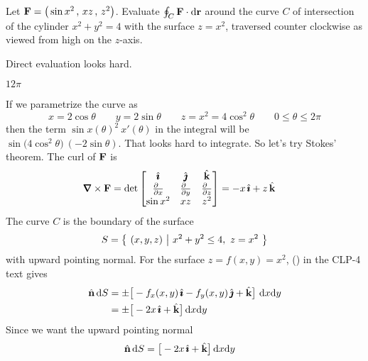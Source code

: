 \begin{question}[M317 2005A] %
Let $\mathbf{F} = \big(\sin x^2\,,\,xz\,,\,z^2\big)$.
Evaluate $\oint_C\mathbf{F}\cdot\mathrm{d}\mathbf{r}$ around the curve $C$ of
intersection of the cylinder $x^2+y^2=4$ with the surface $z=x^2$, traversed
counter clockwise as viewed from high on the $z$-axis.
\end{question}

\begin{hint}
Direct evaluation looks hard.  
\end{hint}

\begin{answer} 
$12\pi$
\end{answer}


\begin{solution}
If we parametrize the curve as 
\begin{equation*}
x = 2\cos\theta\qquad 
y = 2\sin\theta\qquad
z= x^2 = 4\cos^2\theta\qquad
0\le\theta\le 2\pi
\end{equation*}
then the term $\sin x(\theta)^2\ x'(\theta)$ in the integral will be
$\sin\big(4\cos^2\theta\big)\ (-2\sin\theta)$. That looks hard to integrate.
So let's try Stokes' theorem.
The curl of $\mathbf{F}$ is
\begin{align*}
\vnabla\times\vF
&=\det\left[\begin{matrix}
\hi &\hj &\hk \\
\tfrac{\partial\hfill}{\partial x} & \tfrac{\partial\hfill}{\partial y} & 
                \tfrac{\partial\hfill}{\partial z} \\
\sin x^2 & xz & z^2
\end{matrix}
\right]
=-x\,\hi +z\,\hk
\end{align*}
The curve $C$ is the boundary of the surface
\begin{equation*}
S = \big\{ \ (x,y,z)\ \big|\ x^2+y^2\le 4,\ z=x^2\ \big\}
\end{equation*}
with upward pointing normal.
For the surface $z=f(x,y) = x^2$,
() in the CLP-4 text gives
\begin{align*}
\hn\, \dee{S} & = \pm\big[-f_x(x,y)\,\hi - f_y(x,y)\,\hj + \hk\big]\ 
          \dee{x}\dee{y}  \\
             & = \pm \big[-2x\,\hi+\hk\big]\,\dee{x}\dee{y}
\end{align*}
Since we want the upward pointing normal
\begin{align*}
\hat{\mathbf{n}}\, \mathrm{d}S & = \big[-2x\,\hat{\pmb{\imath}}+\hat{\mathbf{k}}\big]\,\mathrm{d}x\mathrm{d}y
\end{align*}

\end{solution}
